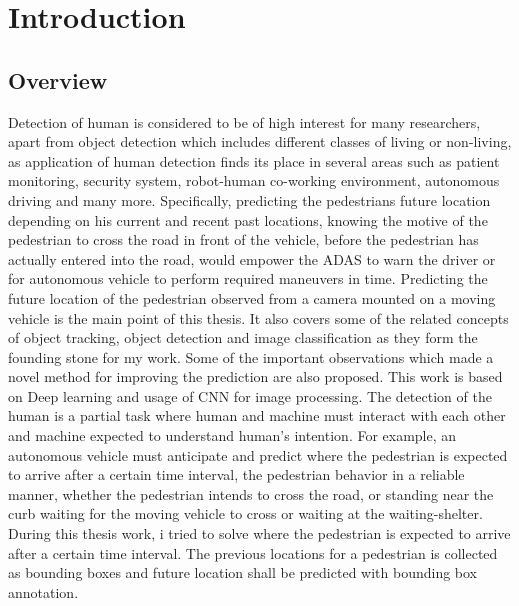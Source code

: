 \pagestyle{fancy}
\fancyhf{}
\fancyhead[EL]{\leftmark} %
\fancyhead[OL]{\leftmark}
\fancyhead[ER,OR]{\thepage}

\setcounter{page}{1}

\chapter{Introduction}
\section{Overview}
Detection of human is considered to be of high interest for many researchers, apart from object detection which includes different classes of living or non-living, as application of human detection finds its place in several areas such as patient monitoring, security system, robot-human co-working environment, autonomous driving and many more. Specifically, predicting the pedestrians future 
location depending on his current and recent past locations, knowing the motive of the pedestrian to cross the road in front of the vehicle, before the pedestrian has actually entered into the road, would empower the ADAS to warn the driver or for autonomous vehicle to perform required maneuvers in time.
Predicting the future location of the pedestrian observed from a camera mounted on a moving vehicle is the main point of this thesis. It also covers some of the related concepts of object tracking, object detection and image classification as they form the founding stone for my work. Some of the important observations which made a novel method for improving the prediction are also proposed. This work is based on Deep learning and usage of CNN for image processing. The detection of the human is a partial task where human and machine must interact with each other and machine expected to understand human's intention. For example, an autonomous vehicle must anticipate and predict where the pedestrian is expected to arrive after a certain time interval, the pedestrian behavior in a reliable manner, whether the pedestrian intends to cross the road, or standing near the curb waiting for the moving vehicle to cross or waiting at the waiting-shelter. During this thesis work, i tried to solve where the pedestrian is expected to arrive after a certain time interval. The previous locations for a pedestrian is collected as bounding boxes and future location shall be predicted with bounding box annotation.

